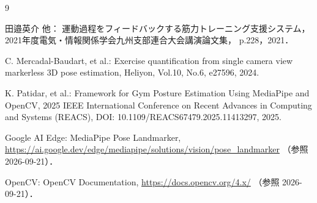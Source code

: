 \documentclass[no-page-number]{nanzan-abstract}
\begin{document}
\begin{thebibliography}{9}
\small
\setlength{\itemsep}{0pt}

田邉英介 他：
運動過程をフィードバックする筋力トレーニング支援システム，
2021年度電気・情報関係学会九州支部連合大会講演論文集，
p.228，2021．

C. Mercadal-Baudart, et al.:
Exercise quantification from single camera view markerless 3D pose estimation,
Heliyon, Vol.10, No.6, e27596, 2024.

K. Patidar, et al.:
Framework for Gym Posture Estimation Using MediaPipe and OpenCV,
2025 IEEE International Conference on Recent Advances in Computing and Systems (REACS),
DOI: 10.1109/REACS67479.2025.11413297, 2025.

Google AI Edge: MediaPipe Pose Landmarker,
\url{https://ai.google.dev/edge/mediapipe/solutions/vision/pose_landmarker}
（参照 2026-09-21）．

OpenCV: OpenCV Documentation,
\url{https://docs.opencv.org/4.x/}
（参照 2026-09-21）．

\end{thebibliography}
\end{document}
